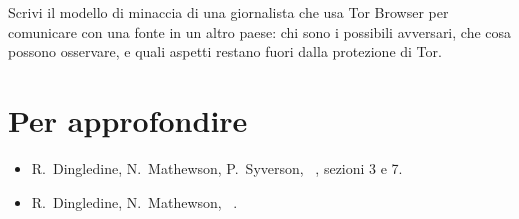 \begin{esercizio}[2]\label{es:04-modello}
Scrivi il modello di minaccia di una giornalista che usa Tor Browser per comunicare con una fonte in un altro paese: chi sono i possibili avversari, che cosa possono osservare, e quali aspetti restano fuori dalla protezione di Tor.
\end{esercizio}

\section*{Per approfondire}
\begin{itemize}
  \item R.~Dingledine, N.~Mathewson, P.~Syverson, ~\cite{dingledine2004tor}, sezioni 3 e 7.
  \item R.~Dingledine, N.~Mathewson, ~\cite{dingledine2006company}.
\end{itemize}
